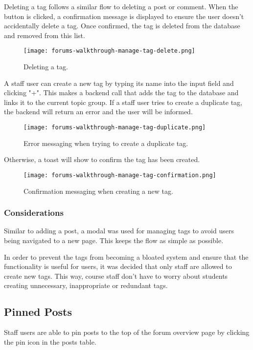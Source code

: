 Deleting a tag follows a similar flow to deleting a post or comment.
When the button is clicked, a confirmation message is displayed to ensure the user doesn't accidentally delete a tag.
Once confirmed, the tag is deleted from the database and removed from this list.

\newpage

\begin{figure}[h!]
    \texttt{[image: forums-walkthrough-manage-tag-delete.png]}
    \centering
    \caption{Deleting a tag.}
\end{figure}

A staff user can create a new tag by typing its name into the input field and clicking "+".
This makes a backend call that adds the tag to the database and links it to the current topic group.
If a staff user tries to create a duplicate tag, the backend will return an error and the user will be informed.

\begin{figure}[h!]
    \texttt{[image: forums-walkthrough-manage-tag-duplicate.png]}
    \centering
    \caption{Error messaging when trying to create a duplicate tag.}
\end{figure}

Otherwise, a toast will show to confirm the tag has been created.

\begin{figure}[h!]
    \texttt{[image: forums-walkthrough-manage-tag-confirmation.png]}
    \centering
    \caption{Confirmation messaging when creating a new tag.}
\end{figure}

\subsubsection{Considerations}
Similar to adding a post, a modal was used for managing tags to avoid users being navigated to a new page.
This keeps the flow as simple as possible.

In order to prevent the tags from becoming a bloated system and ensure that the functionality is useful for users, it was decided that only staff are allowed to create new tags.
This way, course staff don't have to worry about students creating unnecessary, inappropriate or redundant tags.

\subsection{Pinned Posts}
Staff users are able to pin posts to the top of the forum overview page by clicking the pin icon in the posts table.

